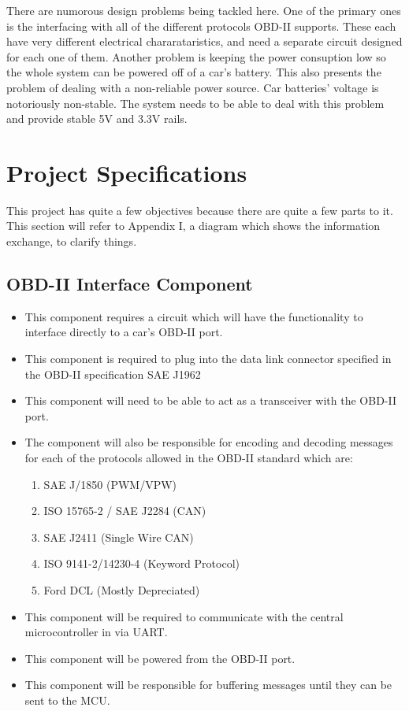 \documentclass[12pt,letterpaper]{article}
\begin{document}
There are numorous design problems being tackled here. One of the primary ones is the interfacing with all of the different protocols OBD-II supports. These each have very different electrical chararataristics, and need a separate circuit designed for each one of them. Another problem is keeping the power consuption low so the whole system can be powered off of a car's battery. This also presents the problem of dealing with a non-reliable power source. Car batteries' voltage is notoriously non-stable. The system needs to be able to deal with this problem and provide stable 5V and 3.3V rails. 

\section{Project Specifications}
This project has quite a few objectives because there are quite a few parts to it. This section will refer to Appendix I, a diagram which shows the information exchange, to clarify things.

\subsection{OBD-II Interface Component}
\begin{itemize}
	\item This component requires a circuit which will have the functionality to interface directly to a car's OBD-II port. 
	\item This component is required to plug into the data link connector specified in the OBD-II specification SAE J1962
	\item This component will need to be able to act as a transceiver with the OBD-II port.
	\item The component will also be responsible for encoding and decoding messages for each of the protocols allowed in the OBD-II standard which are:
	\begin{enumerate}
		\item SAE J/1850 (PWM/VPW)
		\item ISO 15765-2 / SAE J2284 (CAN)
		\item SAE J2411 (Single Wire CAN)
		\item ISO 9141-2/14230-4 (Keyword Protocol)
		\item Ford DCL (Mostly Depreciated) 
	\end{enumerate}
	\item This component will be required to communicate with the central microcontroller in via UART.
	\item This component will be powered from the OBD-II port.
	\item This component will be responsible for buffering messages until they can be sent to the MCU.
\end{itemize}
\end{document}

